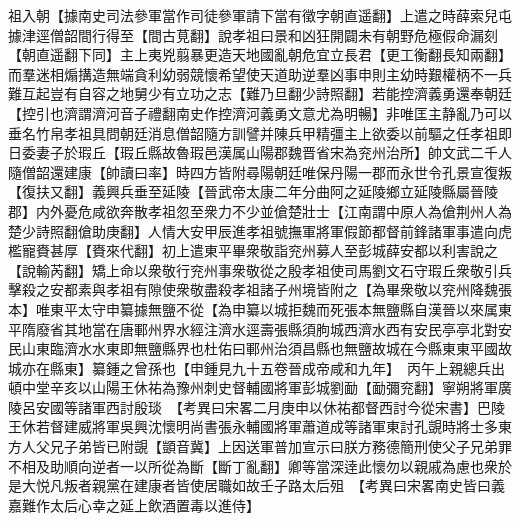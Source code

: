 祖入朝【據南史司法參軍當作司徒參軍請下當有徵字朝直遥翻】上遣之時薛索兒屯據津逕僧韶間行得至【間古莧翻】說孝祖曰景和凶狂開闢未有朝野危極假命漏刻【朝直遥翻下同】主上夷兇翦暴更造天地國亂朝危宜立長君【更工衡翻長知兩翻】而羣迷相煽搆造無端貪利幼弱競懷希望使天道助逆羣凶事申則主幼時艱權柄不一兵難互起豈有自容之地舅少有立功之志【難乃旦翻少詩照翻】若能控濟義勇還奉朝廷【控引也濟謂濟河音子禮翻南史作控濟河義勇文意尤為明暢】非唯匡主静亂乃可以垂名竹帛孝祖具問朝廷消息僧韶隨方訓譬并陳兵甲精彊主上欲委以前驅之任孝祖即日委妻子於瑕丘【瑕丘縣故魯瑕邑漢属山陽郡魏晋省宋為兖州治所】帥文武二千人隨僧韶還建康【帥讀曰率】時四方皆附尋陽朝廷唯保丹陽一郡而永世令孔景宣復叛【復扶又翻】義興兵垂至延陵【晉武帝太康二年分曲阿之延陵鄉立延陵縣屬晉陵郡】内外憂危咸欲奔散孝祖忽至衆力不少並傖楚壯士【江南謂中原人為傖荆州人為楚少詩照翻傖助庚翻】人情大安甲辰進孝祖號撫軍將軍假節都督前鋒諸軍事遣向虎檻寵賚甚厚【賚來代翻】初上遣東平畢衆敬詣兖州募人至彭城薛安都以利害說之【說輸芮翻】矯上命以衆敬行兖州事衆敬從之殷孝祖使司馬劉文石守瑕丘衆敬引兵擊殺之安都素與孝祖有隙使衆敬盡殺孝祖諸子州境皆附之【為畢衆敬以兖州降魏張本】唯東平太守申纂據無鹽不從【為申纂以城拒魏而死張本無鹽縣自漢晉以來属東平隋廢省其地當在唐鄆州界水經注濟水逕壽張縣須朐城西濟水西有安民亭亭北對安民山東臨濟水水東即無鹽縣界也杜佑曰鄆州治須昌縣也無鹽故城在今縣東東平國故城亦在縣東】纂鍾之曾孫也【申鍾見九十五卷晉成帝咸和九年】　丙午上親總兵出頓中堂辛亥以山陽王休祐為豫州刺史督輔國將軍彭城劉勔【勔彌兖翻】寧朔將軍廣陵呂安國等諸軍西討殷琰　【考異曰宋畧二月庚申以休祐都督西討今從宋書】巴陵王休若督建威將軍吳興沈懷明尚書張永輔國將軍蕭道成等諸軍東討孔覬時將士多東方人父兄子弟皆已附覬【顗音冀】上因送軍普加宣示曰朕方務德簡刑使父子兄弟罪不相及助順向逆者一以所從為斷【斷丁亂翻】卿等當深逹此懷勿以親戚為慮也衆於是大悦凡叛者親黨在建康者皆使居職如故壬子路太后殂　【考異曰宋畧南史皆曰義嘉難作太后心幸之延上飲酒置毒以進侍】

